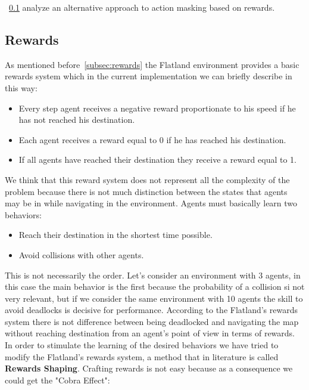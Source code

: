 \documentclass[11pt, a4paper, hidelinks]{report}
\begin{document}
~\ref{subsec:rewards2} analyze an alternative approach to action masking based on rewards.

\subsection{Rewards}\label{subsec:rewards2}

As mentioned before~\ref{subsec:rewards} the Flatland environment provides a basic rewards system which in the current implementation we can briefly describe in this way:
\begin{itemize}
	\item Every step agent receives a negative reward proportionate to his speed if he has not reached his destination.
	\item Each agent receives a reward equal to 0 if he has reached his destination.
	\item If all agents have reached their destination they receive a reward equal to 1.
\end{itemize}
We think that this reward system does not represent all the complexity of the problem because there is not much distinction between the states that agents may be in while navigating in the environment.
Agents must basically learn two behaviors:
\begin{itemize}
	\item Reach their destination in the shortest time possible.
	\item Avoid collisions with other agents.
\end{itemize}
This is not necessarily the order.
Let's consider an environment with 3 agents, in this case the main behavior is the first because the probability of a collision si not very relevant, but if we consider the same environment with 10 agents the skill to avoid deadlocks is decisive for performance.
According to the Flatland's rewards system there is not difference between being deadlocked and navigating the map without reaching destination from an agent's point of view in terms of rewards.
In order to stimulate the learning of the desired behaviors we have tried to modify the Flatland's rewards system, a method that in literature is called \textbf{Rewards Shaping}.
Crafting rewards is not easy because as a consequence we could get the "Cobra Effect":
\end{document}
